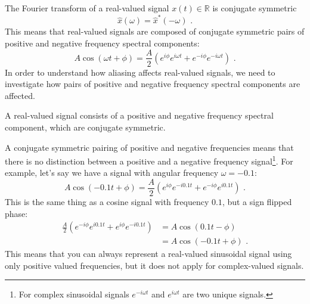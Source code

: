 The Fourier transform of a real-valued signal $x(t)\in\mathbb{R}$ is conjugate symmetric
\begin{equation}
  \hat{x}(\omega) = \hat{x}^*(-\omega)\,\,.
\end{equation}
This means that real-valued signals are composed of conjugate
symmetric pairs of positive and negative frequency spectral
components:
\begin{equation}
A \cos(\omega t + \phi) = \frac{A}{2}(e^{i\phi}e^{i\omega t} + e^{-i\phi}e^{-i\omega t})\,\,.
\end{equation}
In order to understand how aliasing affects real-valued signals, we
 need to investigate how pairs of positive and negative frequency spectral components are affected.
\begin{marginfigure}
\begin{center}
\end{center}
\caption{A real-valued signal consists of a positive and negative frequency spectral component, which are conjugate symmetric.}
\end{marginfigure}
A conjugate symmetric pairing of positive and negative frequencies means that there is no distinction between a positive and a negative frequency 
signal\footnote{For complex sinusoidal signals $e^{-i \omega t}$ and $e^{i \omega t}$ are two unique signals.}. 
For example, let's say we have a signal with angular frequency $\omega = -0.1$:
\begin{equation}
A \cos(-0.1 t + \phi) = \frac{A}{2}(e^{i\phi}e^{-i0.1  t} + e^{-i\phi}e^{i0.1 t})\,\,.
\end{equation}
This is the same thing as a cosine signal with frequency $0.1$, but a sign flipped phase:
\begin{align}
  \frac{A}{2}(e^{-i\phi}e^{i 0.1 t} + e^{i\phi}e^{-i 0.1 t}) &= A \cos(0.1 t - \phi)\\
  &= A \cos(-0.1 t + \phi)\,\,.
\end{align}
This means that you can always represent a real-valued sinusoidal signal using only positive valued frequencies, but it does not apply for complex-valued signals.

